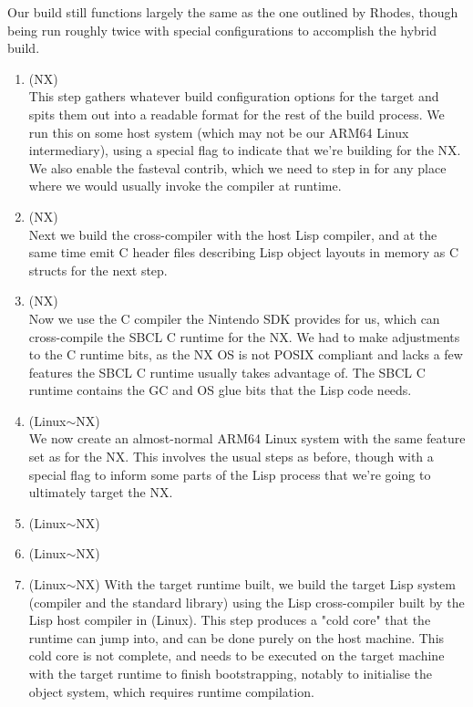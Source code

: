 \documentclass[format=sigconf]{acmart}
\begin{document}
Our build still functions largely the same as the one outlined by Rhodes\cite{rhodes2008sbcl}, though being run roughly twice with special configurations to accomplish the hybrid build.

\begin{enumerate}
\item {} (NX) \\
  This step gathers whatever build configuration options for the target and spits them out into a readable format for the rest of the build process. We run this on some host system (which may not be our ARM64 Linux intermediary), using a special flag to indicate that we're building for the NX. We also enable the fasteval contrib, which we need to step in for any place where we would usually invoke the compiler at runtime.
\item {} (NX) \\
  Next we build the cross-compiler with the host Lisp compiler, and at the same time emit C header files describing Lisp object layouts in memory as C structs for the next step.
\item {} (NX) \\
  Now we use the C compiler the Nintendo SDK provides for us, which can cross-compile the SBCL C runtime for the NX. We had to make adjustments to the C runtime bits, as the NX OS is not POSIX compliant and lacks a few features the SBCL C runtime usually takes advantage of. The SBCL C runtime contains the GC and OS glue bits that the Lisp code needs.
\item {} (Linux$\sim$NX) \\
  We now create an almost-normal ARM64 Linux system with the same feature set as for the NX. This involves the usual steps as before, though with a special flag to inform some parts of the Lisp process that we're going to ultimately target the NX.
\item {} (Linux$\sim$NX)
\item {} (Linux$\sim$NX)
\item {} (Linux$\sim$NX)
  With the target runtime built, we build the target Lisp system (compiler and the standard library) using the Lisp cross-compiler built by the Lisp host compiler in  (Linux). This step produces a "cold core" that the runtime can jump into, and can be done purely on the host machine. This cold core is not complete, and needs to be executed on the target machine with the target runtime to finish bootstrapping, notably to initialise the object system, which requires runtime compilation.

\end{enumerate}
\end{document}
